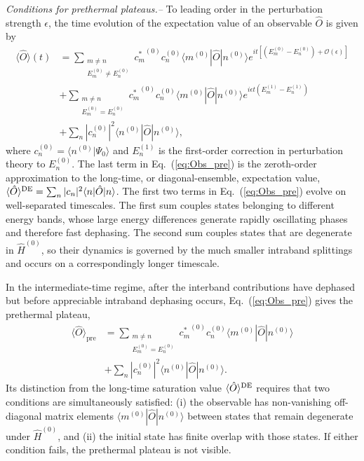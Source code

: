 \documentclass[aps,prl,amsfonts,floatfix,superscriptaddress,longbibliography,twocolumn,footinbib]{revtex4-2}
\begin{document}
{\em Conditions for prethermal plateaus.--} To leading order in the perturbation strength $\epsilon$, the time evolution of the expectation value of an observable $\hat O$ is given by
\begin{align}
    \langle \hat{O} \rangle (t) &= \!\! \!\! \sum_{\substack{m \neq n \\ E_m^{(0)} \neq E_n^{(0)}}} \!\!\!\! \! \!{c_m^*}^{(0)} c_n^{(0)} \langle m^{(0)}|\hat{O}|n^{(0)} \rangle e^{i t[(E_m^{(0)} - E_n^{(0)}) 
    + \mathcal{O}(\epsilon)]} \nonumber \\
    & + \!\!\!\! \sum_{\substack{m \neq n \\ E_m^{(0)} = E_n^{(0)}}} \!\! \!\! \! \! {c_m^*}^{(0)} c_n^{(0)} \langle m^{(0)}|\hat{O}|n^{(0)} \rangle e^{i\epsilon t(E_m^{(1)} - E_n^{(1)})} \nonumber \\
    & + \sum_n |c_n^{(0)}|^2\langle n^{(0)}|\hat{O}|n^{(0)} \rangle  ,
    \label{eq:Obs_pre}
\end{align}
where $c_n^{(0)}=\langle n^{(0)}|\Psi_0\rangle$ and $E^{(1)}_n$ is the first-order correction in perturbation theory to $E_n^{(0)}$. The last term in Eq.~(\ref{eq:Obs_pre}) is the zeroth-order approximation to the long-time, or diagonal-ensemble, expectation value, 
$\langle \hat{O} \rangle^{\rm DE}
=
\sum_n |c_n|^2\langle n|\hat{O}|n\rangle$. 
The first two terms in Eq.~(\ref{eq:Obs_pre}) evolve on well-separated timescales. The first sum couples states belonging to different energy bands, whose large energy differences generate rapidly oscillating phases and therefore fast dephasing. The second sum couples states that are degenerate in $\hat H^{(0)}$, so their dynamics is governed by the much smaller intraband splittings and occurs on a correspondingly longer timescale. 

In the intermediate-time regime, after the interband contributions have dephased but before appreciable intraband dephasing occurs, Eq.~(\ref{eq:Obs_pre}) gives the prethermal plateau,
\begin{align}
    \langle \hat{O} \rangle_\mathrm{pre} &= \sum_{\substack{m \neq n \\ E_m^{(0)} = E_n^{(0)}}} \!\! \!\! \! \! {c_m^*}^{(0)} c_n^{(0)} \langle m^{(0)}|\hat{O}|n^{(0)} \rangle \nonumber \\
    & + \sum_n |c_n^{(0)}|^2\langle n^{(0)}|\hat{O}|n^{(0)} \rangle  .    \label{eq:Obs_pre2}
\end{align}
Its distinction from the long-time saturation value
$\langle \hat{O} \rangle^{\rm DE}$ requires that two conditions are simultaneously satisfied: (i) the observable has non-vanishing off-diagonal matrix elements $\langle m^{(0)}|\hat O|n^{(0)}\rangle$ between states that remain degenerate under $\hat H^{(0)}$, and (ii) the initial state has finite overlap with those states. 
If either condition fails, the prethermal plateau is not visible.
\end{document}
